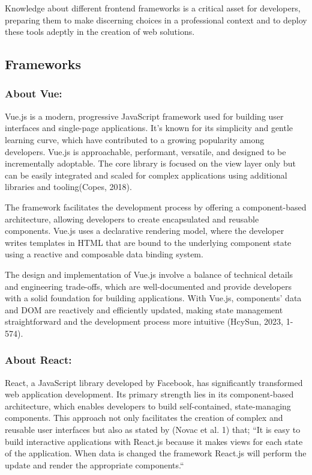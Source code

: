 Knowledge about different frontend frameworks is a critical asset for developers, preparing them to make discerning choices in a professional context and to deploy these tools adeptly in the creation of web solutions.

\subsection{Frameworks}

\subsubsection{About Vue:}

Vue.js is a modern, progressive JavaScript framework used for building user interfaces and single-page applications. It's known for its simplicity and gentle learning curve, which have contributed to a growing popularity among developers. Vue.js is approachable, performant, versatile, and designed to be incrementally adoptable. The core library is focused on the view layer only but can be easily integrated and scaled for complex applications using additional libraries and tooling​​ (Copes, 2018).

The framework facilitates the development process by offering a component-based architecture, allowing developers to create encapsulated and reusable components. Vue.js uses a declarative rendering model, where the developer writes templates in HTML that are bound to the underlying component state using a reactive and composable data binding system.

The design and implementation of Vue.js involve a balance of technical details and engineering trade-offs, which are well-documented and provide developers with a solid foundation for building applications. With Vue.js, components' data and DOM are reactively and efficiently updated, making state management straightforward and the development process more intuitive (HcySun, 2023, 1-574).


\subsubsection{About React:}

React, a JavaScript library developed by Facebook, has significantly transformed web application development. Its primary strength lies in its component-based architecture, which enables developers to build self-contained, state-managing components. This approach not only facilitates the creation of complex and reusable user interfaces but also as stated by (Novac et al. 1) that; “It is easy to build interactive applications with React.js because it makes views for each state of the application. When data is changed the framework React.js will perform the update and render the appropriate components.“


